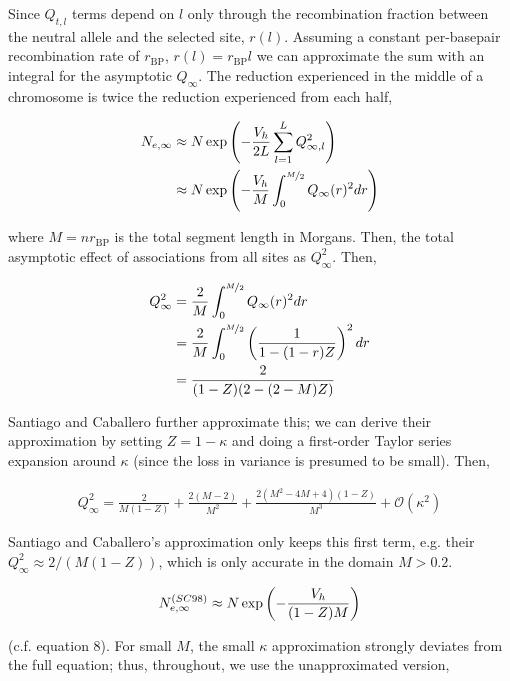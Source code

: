 \documentclass[11pt]{article}
\begin{document}
Since $Q_{t,l}$ terms depend on $l$ only through the recombination fraction
between the neutral allele and the selected site, $r(l)$. Assuming a constant
per-basepair recombination rate of $r_\text{BP}$, $r(l) = r_\text{BP} l$ we can
approximate the sum with an integral for the asymptotic $Q_\infty$. The
reduction experienced in the middle of a chromosome is twice the reduction
experienced from each half, 

\begin{align}
      N_{e,\infty} &\approx N \exp\left(- \frac{V_{h}}{2L} \sum_{l=1}^L Q_{\infty,l}^2\right) \\
              &\approx N \exp\left(- \frac{V_{h}}{M} \int_0^{\nicefrac{M}{2}} Q_{\infty}(r)^2 dr \right) \\
\end{align}

where $M = n r_\text{BP}$ is the total segment length in Morgans. Then, the
total asymptotic effect of associations from all sites as $Q_\infty^2$.  Then,

\begin{align}
  Q_\infty^2 &= \frac{2}{M}\int_0^{\nicefrac{M}{2}} Q_{\infty}(r)^2 dr  \\
  &=  \frac{2}{M} \int_0^{\nicefrac{M}{2}} \left(\frac{1}{1 - (1-r)Z}\right)^2 dr  \\
  &= \frac{2}{(1-Z) (2-(2-M) Z)}
\end{align}

Santiago and Caballero further approximate this; we can derive their
approximation by setting $Z = 1-\kappa$ and doing a first-order Taylor series
expansion around $\kappa$ (since the loss in variance is presumed to be small).
Then,

\begin{align}
  Q_\infty^2 = \frac{2}{M (1-Z)} + \frac{2 (M-2)}{M^2}+\frac{2 \left(M^2-4 M+4\right) (1-Z)}{M^3} + \mathcal{O}(\kappa^2)
\end{align}

Santiago and Caballero's approximation only keeps this first term, e.g. their
$Q_\infty^2 \approx 2/(M(1-Z))$, which is only accurate in the domain $M >
0.2$. 

\begin{align}
  N_{e,\infty}^{\text(SC98)} \approx N \exp\left(-\frac{V_h}{(1-Z)M}\right) 
\end{align}

(c.f. \cite{Santiago1998-bs} equation 8). For small $M$, the small $\kappa$
approximation strongly deviates from the full equation; thus, throughout, we
use the unapproximated version,
\end{document}

